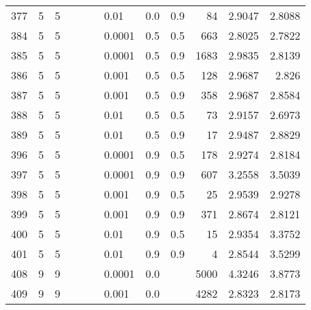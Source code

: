 \begin{longtable}{lrrrrrlrrrrr}
 377 &       5 & 5 &   &   &   &                        0.01 &  0.0 &    0.9 &      84 &                 2.9047 &                 2.8088 \\
 384 &       5 & 5 &   &   &   &                      0.0001 &  0.5 &    0.5 &     663 &                 2.8025 &                 2.7822 \\
 385 &       5 & 5 &   &   &   &                      0.0001 &  0.5 &    0.9 &    1683 &                 2.9835 &                 2.8139 \\
 386 &       5 & 5 &   &   &   &                       0.001 &  0.5 &    0.5 &     128 &                 2.9687 &                  2.826 \\
 387 &       5 & 5 &   &   &   &                       0.001 &  0.5 &    0.9 &     358 &                 2.9687 &                 2.8584 \\
 388 &       5 & 5 &   &   &   &                        0.01 &  0.5 &    0.5 &      73 &                 2.9157 &                 2.6973 \\
 389 &       5 & 5 &   &   &   &                        0.01 &  0.5 &    0.9 &      17 &                 2.9487 &                 2.8829 \\
 396 &       5 & 5 &   &   &   &                      0.0001 &  0.9 &    0.5 &     178 &                 2.9274 &                 2.8184 \\
 397 &       5 & 5 &   &   &   &                      0.0001 &  0.9 &    0.9 &     607 &                 3.2558 &                 3.5039 \\
 398 &       5 & 5 &   &   &   &                       0.001 &  0.9 &    0.5 &      25 &                 2.9539 &                 2.9278 \\
 399 &       5 & 5 &   &   &   &                       0.001 &  0.9 &    0.9 &     371 &                 2.8674 &                 2.8121 \\
 400 &       5 & 5 &   &   &   &                        0.01 &  0.9 &    0.5 &      15 &                 2.9354 &                 3.3752 \\
 401 &       5 & 5 &   &   &   &                        0.01 &  0.9 &    0.9 &       4 &                 2.8544 &                 3.5299 \\
 408 &       9 & 9 &   &   &   &                      0.0001 &  0.0 &        &    5000 &                 4.3246 &                 3.8773 \\
 409 &       9 & 9 &   &   &   &                       0.001 &  0.0 &        &    4282 &                 2.8323 &                 2.8173 \\

\end{longtable}
